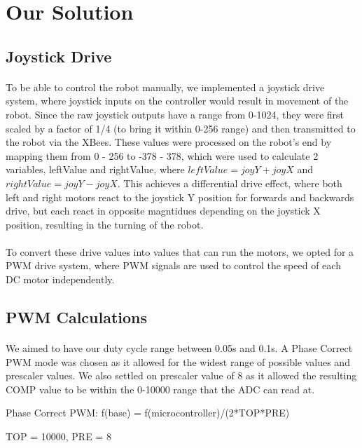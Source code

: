 \documentclass[12pt, a4paper]{article}
\begin{document}
\section{Our Solution} \label{sec:Solution}
\subsection{Joystick Drive}
  \paragraph{}
    To be able to control the robot manually, we implemented a joystick drive system, where joystick inputs on the controller would result in movement of the robot. Since the raw joystick outputs have a range from 0-1024, they were first scaled by a factor of 1/4 (to bring it within 0-256 range) and then transmitted to the robot via the XBees.
    These values were processed on the robot's end by mapping them from 0 - 256 to -378 - 378, which were used to calculate 2 variables, leftValue and rightValue, where $leftValue = joyY + joyX$ and $rightValue = joyY - joyX$.
    This achieves a differential drive effect, where both left and right motors react to the joystick Y position for forwards and backwards drive, but each react in opposite magntidues depending on the joystick X position, resulting in the turning of the robot.
  \paragraph{}
    To convert these drive values into values that can run the motors, we opted for a PWM drive system, where PWM signals are used to control the speed of each DC motor independently.
\subsection{PWM Calculations}
  \paragraph{}
    We aimed to have our duty cycle range between 0.05s and 0.1s.
    A Phase Correct PWM mode was chosen as it allowed for the widest range of possible values and prescaler values.
    We also settled on prescaler value of 8 as it allowed the resulting COMP value to be within the 0-10000 range that the ADC can read at.

    Phase Correct PWM: f(base) = f(microcontroller)/(2*TOP*PRE)

    TOP = 10000, PRE = 8
\end{document}
